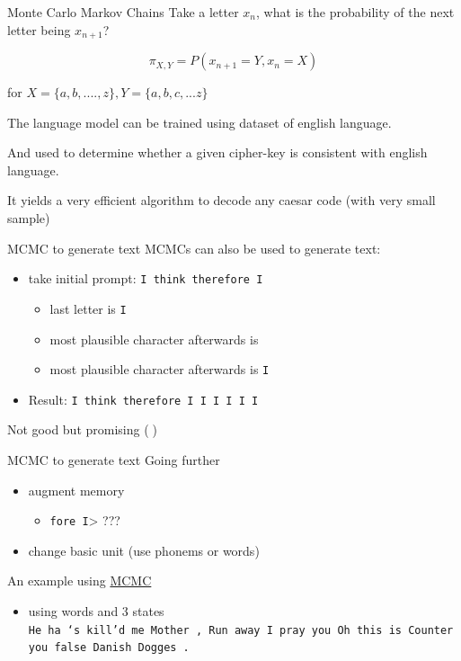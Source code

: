 \documentclass[
  ignorenonframetext,
]{beamer}
\providecommand{\tightlist}{%
  \setlength{\itemsep}{0pt}\setlength{\parskip}{0pt}}\usepackage{longtable,booktabs,array}
\begin{document}
\begin{frame}{Monte Carlo Markov Chains}
\label{monte-carlo-markov-chains}
Take a letter \(x_n\), what is the probability of the next letter being
\(x_{n+1}\)?

\[\pi_{X,Y} = P(x_{n+1}=Y, x_{n}=X)\]

for \(X=\{a, b, .... , z\} , Y=\{a,b,c, ... z\}\)

The language model can be trained using dataset of english language.

And used to determine whether a given cipher-key is consistent with
english language.

It yields a very efficient algorithm to decode any caesar code (with
very small sample)
\end{frame}

\begin{frame}[fragile]{MCMC to generate text}
\label{mcmc-to-generate-text}
MCMCs can also be used to generate text:

\begin{itemize}
\tightlist
\item
  take initial prompt: \texttt{I\ think\ therefore\ I}

  \begin{itemize}
  \tightlist
  \item
    last letter is \texttt{I}
  \item
    most plausible character afterwards is \texttt{}
  \item
    most plausible character afterwards is \texttt{I}
  \end{itemize}
\item
  Result: \texttt{I\ think\ therefore\ I\ I\ I\ I\ I\ I}
\end{itemize}

Not good but promising (🤷)
\end{frame}

\begin{frame}[fragile]{MCMC to generate text}
\label{mcmc-to-generate-text-1}
Going further

\begin{itemize}
\tightlist
\item
  augment memory

  \begin{itemize}
  \tightlist
  \item
    \texttt{fore\ I}\textgreater{} ???
  \end{itemize}
\item
  change basic unit (use phonems or words)
\end{itemize}

An example using
\href{https://towardsdatascience.com/text-generation-with-markov-chains-an-introduction-to-using-markovify-742e6680dc33}{MCMC}

\begin{itemize}
\tightlist
\item
  using words and 3 states
  \texttt{He\ ha\ ‘s\ kill’d\ me\ Mother\ ,\ Run\ away\ I\ pray\ you\ Oh\ this\ is\ Counter\ you\ false\ Danish\ Dogges\ .}
\end{itemize}
\end{frame}
\end{document}
